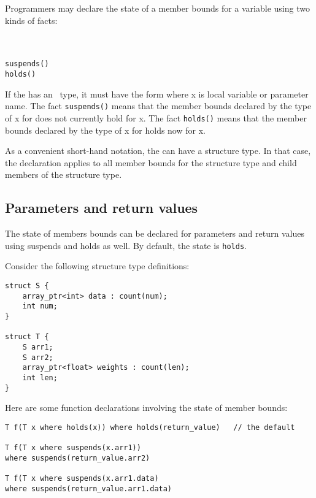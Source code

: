 Programmers may declare the state of a member bounds for a variable
using two kinds of facts:
\begin{tabbing}
\= \\
\> \var{\ldots{}} \\
\> \texttt{suspends()} \\
\> \texttt{holds()}
\end{tabbing}

If the  has an \arrayptr\ type, it must
have the form  where x is local variable or parameter
name. The fact \texttt{suspends(}\texttt{)} means that the
member bounds declared by the type of x for  does not
currently hold for x. The fact \texttt{holds(}\texttt{)}
means that the member bounds declared by the type of x for 
holds now for x.

As a convenient short-hand notation, the  can have
a structure type. In that case, the declaration applies to all member
bounds for the structure type and child members of the structure type.

\subsection{Parameters and return values}

The state of members bounds can be declared for parameters and return
values using suspends and holds as well. By default, the state is
\texttt{holds}.

Consider the following structure type definitions:

\begin{verbatim}
struct S {
    array_ptr<int> data : count(num);
    int num;
}

struct T {
    S arr1;
    S arr2;
    array_ptr<float> weights : count(len);
    int len;
}
\end{verbatim}

Here are some function declarations involving the state of member
bounds:
\begin{verbatim}
T f(T x where holds(x)) where holds(return_value)   // the default 

T f(T x where suspends(x.arr1))
where suspends(return_value.arr2)

T f(T x where suspends(x.arr1.data)
where suspends(return_value.arr1.data)
\end{verbatim}

